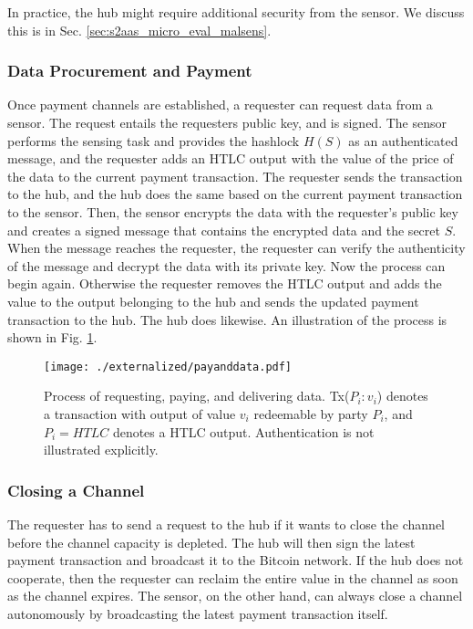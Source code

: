 In practice, the hub might require additional security from the sensor. We discuss this is in Sec. \ref{sec:s2aas_micro_eval_malsens}.

\subsubsection{Data Procurement and Payment}

Once payment channels are established, a requester can request data from a sensor. The request entails the requesters public key, and is signed.  
The sensor performs the sensing task and provides the hashlock $H(S)$ as an authenticated message, and the requester adds an \ac{HTLC} output with the value of the price of the data to the current payment transaction. The requester sends the transaction to the hub, and the hub does the same based on the current payment transaction to the sensor. Then, the sensor encrypts the data with the requester's public key and creates a signed message that contains the encrypted data and the secret $S$. When the message reaches the requester, the requester can verify the authenticity of the message and decrypt the data with its private key. Now the process can begin again. Otherwise the requester removes the \ac{HTLC} output and adds the value to the output belonging to the hub and sends the updated payment transaction to the hub. The hub does likewise. An illustration of the process is shown in Fig. \ref{fig:payanddata}.

\begin{figure}
 \texttt{[image: ./externalized/payanddata.pdf]}
 \caption{Process of requesting, paying, and delivering data. Tx($P_i:v_i$) denotes a transaction with output of value $v_i$ redeemable by party $P_i$, and $P_i=HTLC$ denotes a HTLC output. Authentication is not illustrated explicitly.}
 \label{fig:payanddata}
 \end{figure}

 \subsubsection{Closing a Channel}

 The requester has to send a request to the hub if it wants to close the channel before the channel capacity is depleted. The hub will then sign the latest payment transaction and broadcast it to the Bitcoin network. If the hub does not cooperate, then the requester can reclaim the entire value in the channel as soon as the channel expires.
 The sensor, on the other hand, can always close a channel autonomously by broadcasting the latest payment transaction itself. 

